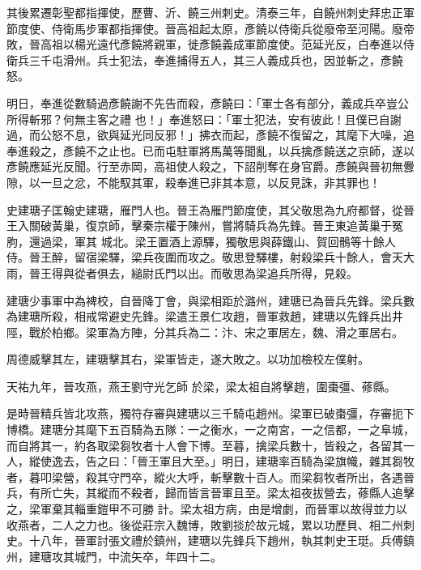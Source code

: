 \begin{pinyinscope}
 其後累遷彰聖都指揮使，歷曹、沂、饒三州刺史。清泰三年，自饒州刺史拜忠正軍節度使、侍衛馬步軍都指揮使。晉高祖起太原，彥饒以侍衛兵從廢帝至河陽。廢帝敗，晉高祖以楊光遠代彥饒將親軍，徙彥饒義成軍節度使。范延光反，白奉進以侍衛兵三千屯滑州。兵士犯法，奉進捕得五人，其三人義成兵也，因並斬之，彥饒怒。



 明日，奉進從數騎過彥饒謝不先告而殺，彥饒曰：「軍士各有部分，義成兵卒豈公所得斬邪？何無主客之禮
 也！」奉進怒曰：「軍士犯法，安有彼此！且僕已自謝過，而公怒不息，欲與延光同反邪！」拂衣而起，彥饒不復留之，其麾下大噪，追奉進殺之，彥饒不之止也。已而屯駐軍將馬萬等聞亂，以兵擒彥饒送之京師，遂以彥饒應延光反聞。行至赤岡，高祖使人殺之，下詔削奪在身官爵。彥饒與晉初無釁隙，以一旦之忿，不能馭其軍，殺奉進已非其本意，以反見誅，非其罪也！



 史建瑭子匡翰史建瑭，雁門人也。晉王為雁門節度使，其父敬思為九府都督，從晉王入關破黃巢，復京師，擊秦宗權于陳州，嘗將騎兵為先鋒。晉王東追黃巢于冤朐，還過梁，軍其
 城北。梁王置酒上源驛，獨敬思與薛鐵山、賀回鶻等十餘人侍。晉王醉，留宿梁驛，梁兵夜圍而攻之。敬思登驛樓，射殺梁兵十餘人，會天大雨，晉王得與從者俱去，縋尉氏門以出。而敬思為梁追兵所得，見殺。



 建瑭少事軍中為裨校，自晉降丁會，與梁相距於潞州，建瑭已為晉兵先鋒。梁兵數為建瑭所殺，相戒常避史先鋒。梁遣王景仁攻趙，晉軍救趙，建瑭以先鋒兵出井陘，戰於柏鄉。梁軍為方陣，分其兵為二：汴、宋之軍居左，魏、滑之軍居右。



 周德威擊其左，建瑭擊其右，梁軍皆走，遂大敗之。以功加檢校左僕射。



 天祐九年，晉攻燕，燕王劉守光乞師
 於梁，梁太祖自將擊趙，圍棗彊、蓚縣。



 是時晉精兵皆北攻燕，獨符存審與建瑭以三千騎屯趙州。梁軍已破棗彊，存審扼下博橋。建瑭分其麾下五百騎為五隊：一之衡水，一之南宮，一之信都，一之阜城，而自將其一，約各取梁芻牧者十人會下博。至暮，擒梁兵數十，皆殺之，各留其一人，縱使逸去，告之曰：「晉王軍且大至。」明日，建瑭率百騎為梁旗幟，雜其芻牧者，暮叩梁營，殺其守門卒，縱火大呼，斬擊數十百人。而梁芻牧者所出，各遇晉兵，有所亡失，其縱而不殺者，歸而皆言晉軍且至。梁太祖夜拔營去，蓚縣人追擊之，梁軍棄其輜重鎧甲不可勝
 計。梁太祖方病，由是增劇，而晉軍以故得並力以收燕者，二人之力也。後從莊宗入魏博，敗劉掞於故元城，累以功歷貝、相二州刺史。十八年，晉軍討張文禮於鎮州，建瑭以先鋒兵下趙州，執其刺史王珽。兵傅鎮州，建瑭攻其城門，中流矢卒，年四十二。




\end{pinyinscope}
